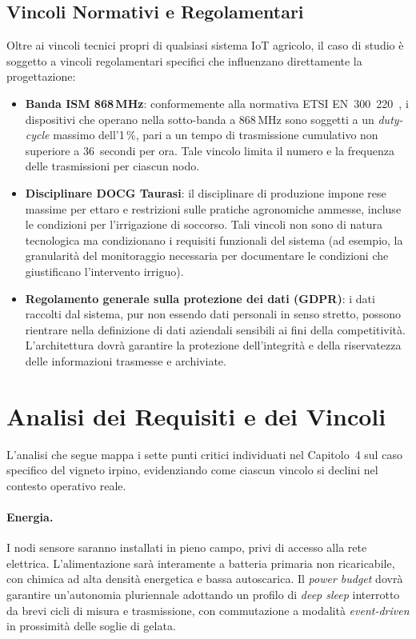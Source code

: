 \subsection{Vincoli Normativi e Regolamentari}

Oltre ai vincoli tecnici propri di qualsiasi sistema IoT agricolo, il caso di studio è soggetto a vincoli regolamentari specifici che influenzano direttamente la progettazione:

\begin{itemize}
	\item \textbf{Banda ISM 868\,MHz}: conformemente alla normativa ETSI EN~300~220~\cite{etsi300220}, i dispositivi che operano nella sotto-banda a 868\,MHz sono soggetti a un \textit{duty-cycle} massimo dell'1\,\%, pari a un tempo di trasmissione cumulativo non superiore a 36~secondi per ora. Tale vincolo limita il numero e la frequenza delle trasmissioni per ciascun nodo.

	\item \textbf{Disciplinare DOCG Taurasi}: il disciplinare di produzione impone rese massime per ettaro e restrizioni sulle pratiche agronomiche ammesse, incluse le condizioni per l'irrigazione di soccorso. Tali vincoli non sono di natura tecnologica ma condizionano i requisiti funzionali del sistema (ad esempio, la granularità del monitoraggio necessaria per documentare le condizioni che giustificano l'intervento irriguo).

	\item \textbf{Regolamento generale sulla protezione dei dati (GDPR)}: i dati raccolti dal sistema, pur non essendo dati personali in senso stretto, possono rientrare nella definizione di dati aziendali sensibili ai fini della competitività. L'architettura dovrà garantire la protezione dell'integrità e della riservatezza delle informazioni trasmesse e archiviate.
\end{itemize}


\section{Analisi dei Requisiti e dei Vincoli}

L'analisi che segue mappa i sette punti critici individuati nel Capitolo~4 sul caso specifico del vigneto irpino, evidenziando come ciascun vincolo si declini nel contesto operativo reale.

\paragraph{Energia.} I nodi sensore saranno installati in pieno campo, privi di accesso alla rete elettrica. L'alimentazione sarà interamente a batteria primaria non ricaricabile, con chimica ad alta densità energetica e bassa autoscarica. Il \textit{power budget} dovrà garantire un'autonomia pluriennale adottando un profilo di \textit{deep sleep} interrotto da brevi cicli di misura e trasmissione, con commutazione a modalità \textit{event-driven} in prossimità delle soglie di gelata.

